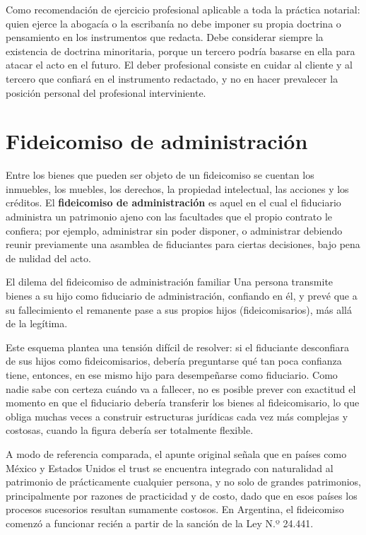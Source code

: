 \documentclass[12pt,oneside]{book}
\begin{document}
\begin{important}
Como recomendación de ejercicio profesional aplicable a toda la práctica notarial: quien ejerce la abogacía o la escribanía no debe imponer su propia doctrina o pensamiento en los instrumentos que redacta. Debe considerar siempre la existencia de doctrina minoritaria, porque un tercero podría basarse en ella para atacar el acto en el futuro. El deber profesional consiste en cuidar al cliente y al tercero que confiará en el instrumento redactado, y no en hacer prevalecer la posición personal del profesional interviniente.
\end{important}

\section{Fideicomiso de administración}

Entre los bienes que pueden ser objeto de un fideicomiso se cuentan los inmuebles, los muebles, los derechos, la propiedad intelectual, las acciones y los créditos. El \textbf{fideicomiso de administración} es aquel en el cual el fiduciario administra un patrimonio ajeno con las facultades que el propio contrato le confiera; por ejemplo, administrar sin poder disponer, o administrar debiendo reunir previamente una asamblea de fiduciantes para ciertas decisiones, bajo pena de nulidad del acto.

\begin{example}{El dilema del fideicomiso de administración familiar}
Una persona transmite bienes a su hijo como fiduciario de administración, confiando en él, y prevé que a su fallecimiento el remanente pase a sus propios hijos (fideicomisarios), más allá de la legítima.

Este esquema plantea una tensión difícil de resolver: si el fiduciante desconfiara de sus hijos como fideicomisarios, debería preguntarse qué tan poca confianza tiene, entonces, en ese mismo hijo para desempeñarse como fiduciario. Como nadie sabe con certeza cuándo va a fallecer, no es posible prever con exactitud el momento en que el fiduciario debería transferir los bienes al fideicomisario, lo que obliga muchas veces a construir estructuras jurídicas cada vez más complejas y costosas, cuando la figura debería ser totalmente flexible.
\end{example}

\begin{note}
A modo de referencia comparada, el apunte original señala que en países como México y Estados Unidos el trust se encuentra integrado con naturalidad al patrimonio de prácticamente cualquier persona, y no solo de grandes patrimonios, principalmente por razones de practicidad y de costo, dado que en esos países los procesos sucesorios resultan sumamente costosos. En Argentina, el fideicomiso comenzó a funcionar recién a partir de la sanción de la Ley N.º 24.441.
\end{note}
\end{document}
